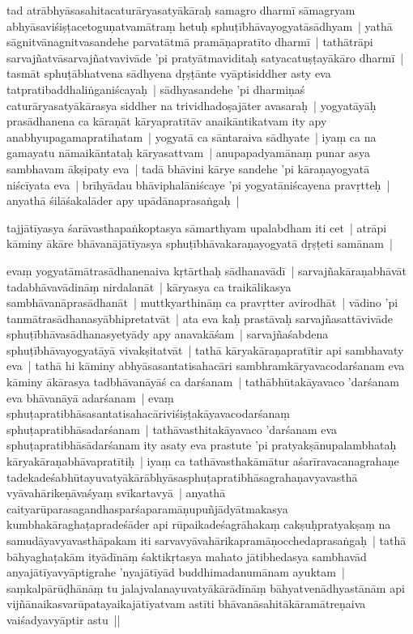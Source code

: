 \documentclass[article,a4paper]{memoir}
\begin{document}
	  \pstart tad atrā\-bhyā\-sasahitacaturā\-ryasatyā\-kā\-raḥ samagro dharmī\- sā\-magryam abhyā\-saviśiṣṭacetoguṇatvamā\-traṃ hetuḥ sphuṭī\-bhā\-vayogyatā\-sā\-dhyam | yathā\- sā\-gnitvā\-nagnitvasandehe parvatā\-tmā\- pramā\-ṇapratī\-to dharmī\- | tathā\-trā\-pi sarvajñatvā\-sarvajñatvavivā\-de 'pi pratyā\-tmaviditaḥ satyacatuṣṭayā\-kā\-ro dharmī\- | tasmā\-t sphuṭā\-bhatvena sā\-dhyena dṛṣṭā\-nte vyā\-ptisiddher asty eva tatpratibaddhaliṅganiścayaḥ | sā\-dhyasandehe 'pi dharmiṇaś caturā\-ryasatyā\-kā\-rasya siddher na trividhadoṣajā\-ter avasaraḥ | yogyatā\-yā\-ḥ prasā\-dhanena ca kā\-raṇā\-t kā\-ryapratī\-tā\-v anaikā\-ntikatvam ity apy anabhyupagamapratihatam | yogyatā\- ca sā\-ntaraiva sā\-dhyate | iyaṃ ca na gamayatu nā\-maikā\-ntataḥ kā\-ryasattvam | anupapadyamā\-naṃ punar asya sambhavam ā\-kṣipaty eva | tadā\- bhā\-vini kā\-rye sandehe 'pi kā\-raṇayogyatā\- niścī\-yata eva | brī\-hyā\-dau bhā\-viphalā\-niścaye 'pi yogyatā\-niścayena pravṛtteḥ | anyathā\- śilā\-śakalā\-der apy upā\-dā\-naprasaṅgaḥ | 
	\pend
      

	  \pstart tajjā\-tī\-yasya śarā\-vasthapaṅkoptasya sā\-marthyam upalabdham iti cet | atrā\-pi kā\-miny ā\-kā\-re bhā\-vanā\-jā\-tī\-yasya sphuṭī\-bhā\-vakaraṇayogyatā\- dṛṣṭeti samā\-nam | 
	\pend
      

	  \pstart evaṃ yogyatā\-mā\-trasā\-dhanenaiva kṛtā\-rthaḥ sā\-dhanavā\-dī\- | sarvajñakā\-raṇabhā\-vā\-t tadabhā\-vavā\-dinā\-ṃ nirdalanā\-t | kā\-ryasya ca traikā\-likasya sambhā\-vanā\-prasā\-dhanā\-t | muttkyarthinā\-ṃ ca pravṛtter avirodhā\-t | vā\-dino 'pi tanmā\-trasā\-dhanasyā\-bhipretatvā\-t | ata eva kaḥ prastā\-vaḥ sarvajñasattā\-vivā\-de sphuṭī\-bhā\-vasā\-dhanasyetyā\-dy apy anavakā\-śam | sarvajñaśabdena sphuṭī\-bhā\-vayogyatā\-yā\- vivakṣitatvā\-t | tathā\- kā\-ryakā\-raṇapratī\-tir api sambhavaty eva | tathā\- hi kā\-miny abhyā\-sasantatisahacā\-ri sambhramkā\-ryavacodarśanam eva kā\-miny ā\-kā\-rasya tadbhā\-vanā\-yā\-ś ca darśanam | tathā\-bhū\-takā\-yavaco 'darśanam eva bhā\-vanā\-yā\- adarśanam | evaṃ sphuṭapratibhā\-sasantatisahacā\-riviśiṣṭakā\-yavacodarśanaṃ sphuṭapratibhā\-sadarśanam | tathā\-vasthitakā\-yavaco 'darśanam eva sphuṭapratibhā\-sā\-darśanam ity asaty eva prastute 'pi pratyakṣā\-nupalambhataḥ kā\-ryakā\-raṇabhā\-vapratī\-tiḥ | iyaṃ ca tathā\-vasthakā\-mā\-tur aśarī\-ravacanagrahaṇe tadekadeśabhū\-tayuvatyā\-kā\-rā\-bhyā\-sasphuṭapratibhā\-sagrahaṇavyavasthā\- vyā\-vahā\-rikeṇā\-vaśyaṃ svī\-kartavyā\- | anyathā\- caityarū\-parasagandhasparśaparamā\-ṇupuñjā\-dyā\-tmakasya kumbhakā\-raghaṭapradeśā\-der api rū\-paikadeśagrā\-hakaṃ cakṣuḥpratyakṣaṃ na samudā\-yavyavasthā\-pakam iti sarvavyā\-vahā\-rikapramā\-ṇocchedaprasaṅgaḥ | tathā\- bā\-hyaghaṭakā\-m ityā\-dī\-nā\-ṃ śaktikṛtasya mahato jā\-tibhedasya sambhavā\-d anyajā\-tī\-yavyā\-ptigrahe 'nyajā\-tī\-yā\-d buddhimadanumā\-nam ayuktam | saṃkalpā\-rū\-ḍhā\-nā\-ṃ tu jalajvalanayuvatyā\-kā\-rā\-dī\-nā\-ṃ bā\-hyatvenā\-dhyastā\-nā\-m api vijñā\-naikasvarū\-patayaikajā\-tī\-yatvam astī\-ti bhā\-vanā\-sahitā\-kā\-ramā\-treṇaiva vaiśadyavyā\-ptir astu ||
	\pend
      
\end{document}
